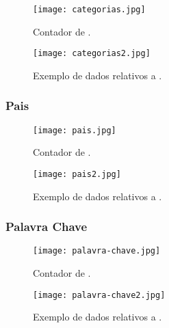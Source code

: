   \begin{figure}[H]
    \centering
    \begin{minipage}[b]{0.25\textwidth}
        \centering
        \texttt{[image: categorias.jpg]}
        \caption{Contador de .}
    \end{minipage}
    \hspace{0.05\textwidth}
    \begin{minipage}[b]{0.6\textwidth}
        \centering
        \texttt{[image: categorias2.jpg]}
        \caption{Exemplo de dados relativos a .}
    \end{minipage}
  \end{figure}

\subsubsection{Pais}

  \begin{figure}[H]
    \centering
    \begin{minipage}[b]{0.25\textwidth}
        \centering
        \texttt{[image: pais.jpg]}
        \caption{Contador de .}
    \end{minipage}
    \hspace{0.05\textwidth}
    \begin{minipage}[b]{0.6\textwidth}
        \centering
        \texttt{[image: pais2.jpg]}
        \caption{Exemplo de dados relativos a .}
    \end{minipage}
  \end{figure}

\subsubsection{Palavra Chave}

  \begin{figure}[H]
    \centering
    \begin{minipage}[b]{0.25\textwidth}
        \centering
        \texttt{[image: palavra-chave.jpg]}
        \caption{Contador de .}
    \end{minipage}
    \hspace{0.05\textwidth}
    \begin{minipage}[b]{0.6\textwidth}
        \centering
        \texttt{[image: palavra-chave2.jpg]}
        \caption{Exemplo de dados relativos a .}
    \end{minipage}
  \end{figure}

